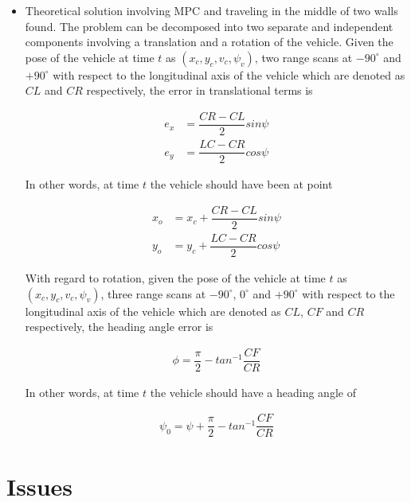 \documentclass[oneside,12pt]{article}
\begin{document}
\begin{itemize}
  \item Theoretical solution involving MPC and traveling in the middle of two
    walls found. The problem can be decomposed into two separate and independent
    components involving a translation and a rotation of the vehicle. Given the
    pose of the vehicle at time $t$ as $(x_c, y_c, v_c, \psi_v)$, two range
    scans at $-90^\circ$ and $+90^\circ$ with respect to the longitudinal axis of
    the vehicle which are denoted as $CL$ and $CR$ respectively, the error in
    translational terms is

    \begin{align}
      e_x &= \dfrac{CR-CL}{2}sin\psi \\
      e_y &= \dfrac{LC-CR}{2}cos\psi
    \end{align}

    In other words, at time $t$ the vehicle should have been at point

    \begin{align}
      x_o &=x_c + \dfrac{CR-CL}{2}sin\psi \\
      y_o &=y_c + \dfrac{LC-CR}{2}cos\psi
    \end{align}

    With regard to rotation, given the pose of the vehicle at time $t$ as
    $(x_c, y_c, v_c, \psi_v)$, three range scans at $-90^\circ$, $0^\circ$ and
    $+90^\circ$ with respect to the longitudinal axis of the vehicle which are
    denoted as $CL$, $CF$ and $CR$ respectively, the heading angle error is

    \begin{align}
      \phi = \dfrac{\pi}{2} - tan^{-1}\dfrac{CF}{CR}
    \end{align}

    In other words, at time $t$ the vehicle should have a heading angle of

    \begin{align}
      \psi_0 = \psi + \dfrac{\pi}{2} - tan^{-1}\dfrac{CF}{CR}
    \end{align}

\end{itemize}



\section{Issues}
\end{document}

